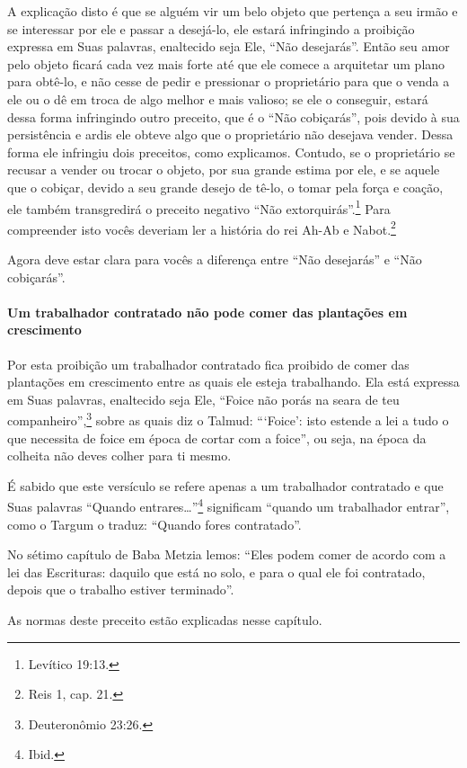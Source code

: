 A explicação disto é que se alguém vir um belo objeto que pertença a seu
irmão e se interessar por ele e passar a desejá-lo, ele estará
infringindo a proibição expressa em Suas palavras, enaltecido seja Ele,
``Não desejarás''. Então seu amor pelo objeto ficará cada vez mais forte
até que ele comece a arquitetar um plano para obtê-lo, e não cesse de
pedir e pressionar o proprietário para que o venda a ele ou o dê em
troca de algo melhor e mais valioso; se ele o conseguir, estará dessa
forma infringindo outro preceito, que é o ``Não cobiçarás'', pois
devido à sua persistência e ardis ele obteve algo que o proprietário não
desejava vender. Dessa forma ele infringiu dois preceitos, como
explicamos. Contudo, se o proprietário se recusar a vender ou trocar o
objeto, por sua grande estima por ele, e se aquele que o cobiçar, devido
a seu grande desejo de tê-lo, o tomar pela força e coação, ele também
transgredirá o preceito negativo ``Não extorquirás''.\footnote{Levítico 19:13.}
Para compreender isto vocês deveriam ler a história do rei Ah-Ab e
Nabot.\footnote{Reis 1, cap. 21.}

Agora deve estar clara para vocês a diferença entre ``Não desejarás'' e
``Não cobiçarás''.

\paragraph{Um trabalhador contratado não pode comer das plantações em crescimento}

Por esta proibição um trabalhador contratado fica proibido de comer das
plantações em crescimento entre as quais ele esteja trabalhando. Ela
está expressa em Suas palavras, enaltecido seja Ele, ``Foice não porás
na seara de teu companheiro'',\footnote{Deuteronômio 23:26.} sobre as quais diz o
Talmud: ```Foice': isto estende a lei a tudo o que necessita de foice
em época de cortar com a foice'', ou seja, na época da colheita não
deves colher para ti mesmo.

É sabido que este versículo se refere apenas a um trabalhador contratado e que Suas palavras ``Quando entrares\ldots{}''\footnote{Ibid.} significam ``quando
um trabalhador entrar'', como o Targum o traduz: ``Quando fores
contratado''.

No sétimo capítulo de Baba Metzia lemos: ``Eles podem comer de acordo
com a lei das Escrituras: daquilo que está no solo, e para o qual ele
foi contratado, depois que o trabalho estiver terminado''.

As normas deste preceito estão explicadas nesse capítulo.

